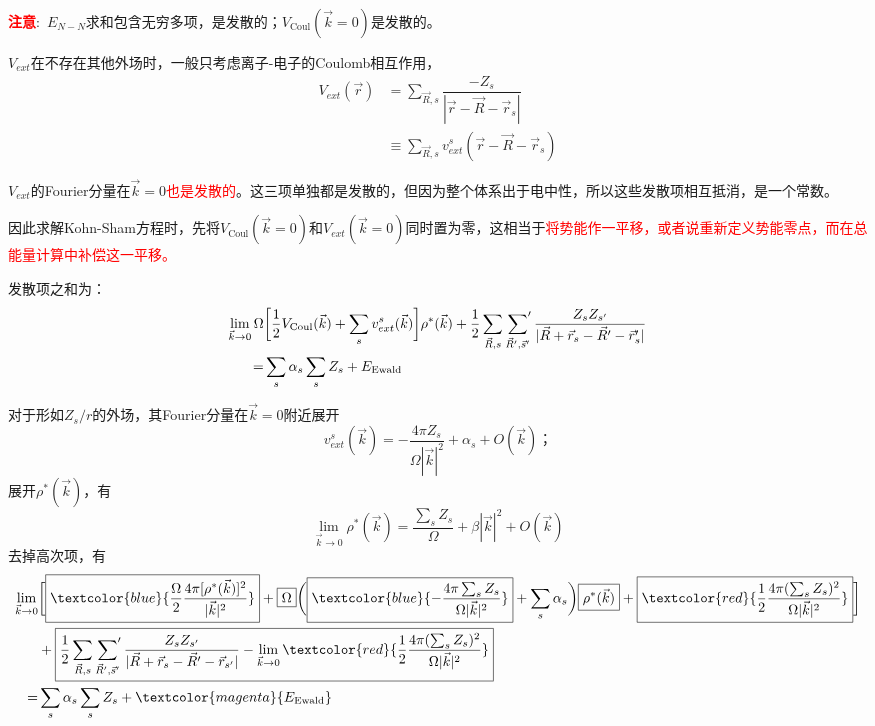 \textcolor{red}{\textbf{注意}}:~$E_{N-N}$求和包含无穷多项，是发散的；$V_{\mathrm{Coul}}(\vec k=0)$是发散的。
	
$V_{ext}$在不存在其他外场时，一般只考虑离子-电子的\textrm{Coulomb}相互作用，
	\begin{equation}
		\begin{aligned}
			V_{ext}(\vec r)&=\sum_{\vec R,s}\dfrac{-Z_s}{|\vec r-\vec R-\vec r_s|}\\
			&\equiv\sum_{\vec R,s}v_{ext}^s(\vec r-\vec R-\vec r_s)
		\end{aligned}
	\end{equation}

$V_{ext}$的\textrm{Fourier}分量在$\vec k=0$\textcolor{red}{也是发散的}。这三项单独都是发散的，但因为整个体系出于电中性，所以这些发散项相互抵消，是一个常数。

因此求解\textrm{Kohn-Sham}方程时，先将$V_{\mathrm{Coul}}(\vec k=0)$和$V_{ext}(\vec k=0)$同时置为零，这相当于\textcolor{red}{将势能作一平移，或者说重新定义势能零点，而在总能量计算中补偿这一平移。}

发散项之和为：
	\begin{equation}
		\begin{aligned}
			\lim_{\vec k\rightarrow0}\Omega&\bigg[\dfrac12V_{\mathrm{Coul}}(\vec k)+\sum_sv_{ext}^s(\vec k)\bigg]\rho^{\ast}(\vec k)+\dfrac12\sum_{\vec R,s}\sideset{}{^{\prime}}\sum_{\vec R^{\prime},\vec s^{\prime}}\dfrac{Z_sZ_{s^{\prime}}}{|\vec R+\vec r_s-\vec R^{\prime}-\vec r_s^{\prime}|}\\
			=&\sum_s\alpha_s\sum_sZ_s+E_{\mathrm{Ewald}}
		\end{aligned}
	\end{equation}

对于形如$Z_s/r$的外场，其\textrm{Fourier}分量在$\vec k=0$附近展开
	\begin{equation}
		v_{ext}^s(\vec k)=-\dfrac{4\pi Z_s}{\Omega|\vec k|^2}+\alpha_s+O(\vec k)； 
	\end{equation}
	展开$\rho^{\ast}(\vec k)$，有
	\begin{equation}
		\lim_{\vec k\rightarrow 0}\rho^{\ast}(\vec k)=\dfrac{\sum_sZ_s}{\Omega}+\beta|\vec k|^2+O(\vec k)
	\end{equation}
去掉高次项，有
\begin{equation}
	\begin{aligned}
		\lim_{\vec k\rightarrow 0}&\bigg[\boxed{\textcolor{blue}{\dfrac{\Omega}2\dfrac{4\pi[\rho^{\ast}(\vec k)]^2}{|\vec k|^2}}}+\boxed{\Omega}\bigg(\boxed{\textcolor{blue}{-\dfrac{4\pi\sum_sZ_s}{\Omega|\vec k|^2}}}+\sum_s\alpha_s\bigg)\boxed{\rho^{\ast}(\vec k)}+\boxed{\textcolor{red}{\dfrac12\dfrac{4\pi(\sum_sZ_s)^2}{\Omega|\vec k|^2}}}\bigg]\\
		&+\boxed{\dfrac12\sum_{\vec R,s}\sideset{}{^{\prime}}\sum_{\vec R^{\prime},\vec s^{\prime}}\dfrac{Z_sZ_{s^{\prime}}}{|\vec R+\vec r_s-\vec R^{\prime}-\vec r_{s^{\prime}}|}-\lim_{\vec k\rightarrow0}\textcolor{red}{\dfrac12\dfrac{4\pi(\sum_sZ_s)^2}{\Omega|\vec k|^2}}}\\
		=&\sum_s\alpha_s\sum_sZ_s+\textcolor{magenta}{E_{\mathrm{Ewald}}}
	\end{aligned}
\end{equation}

